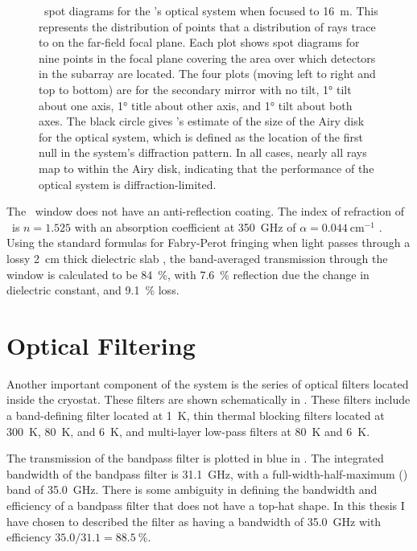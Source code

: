 \begin{figure}
\begin{tabular}{lr}
\end{tabular}
\caption[\ZEMAX\ spot diagrams]{
\ZEMAX\ spot diagrams for the \Imager's optical system when focused to \SI{16}{\m}.
This represents the distribution of points that a distribution of rays trace to on the far-field focal plane.
Each plot shows spot diagrams for nine points in the focal plane covering the area over which detectors in the subarray are located.
The four plots (moving left to right and top to bottom) are for the secondary mirror with no tilt, \ang{1} tilt about one axis, \ang{1} title about other axis, and \ang{1} tilt about both axes.
The black circle gives \ZEMAX's estimate of the size of the Airy disk for the optical system, which is defined as the location of the first null in the system's diffraction pattern.
In all cases, nearly all rays map to within the Airy disk, indicating that the performance of the optical system is diffraction-limited.
}
\label{fig:ch4-spot-diagrams}
\end{figure}

The \HDPE\ window does not have an anti-reflection coating.
The index of refraction of \HDPE\ is $n=1.525$ with an absorption coefficient at \SI{350}{\GHz} of $\alpha = \SI{0.044}{\cm^{-1}}$ \cite{lamb_miscellaneous_1996}.
Using the standard formulas for Fabry-Perot fringing when light passes through a lossy \SI{2}{\cm} thick dielectric slab \cite[Chapter~5]{sophocles_j._ordanidis_electromagnetic_2014}, the band-averaged transmission through the window is calculated to be \SI{84}{\percent}, with \SI{7.6}{\percent} reflection due the change in dielectric constant, and \SI{9.1}{\percent} loss.

\section{Optical Filtering} \label{sec:ch4-filters}

Another important component of the system is the series of optical filters located inside the cryostat.
These filters are shown schematically in .
These filters include a band-defining filter located at \SI{1}{\K}, thin thermal blocking filters located at \SI{300}{\K}, \SI{80}{\K}, and \SI{6}{\K}, and multi-layer low-pass filters at \SI{80}{\K} and \SI{6}{\K}.

The transmission of the bandpass filter is plotted in blue in .
The integrated bandwidth of the bandpass filter is \SI{31.1}{\GHz}, with a full-width-half-maximum (\FWHM) band of \SI{35.0}{\GHz}.
There is some ambiguity in defining the bandwidth and efficiency of a bandpass filter that does not have a top-hat shape.
In this thesis I have chosen to described the filter as having a bandwidth of \SI{35.0}{\GHz} with efficiency $35.0 / 31.1 = \SI{88.5}{\percent}$.

